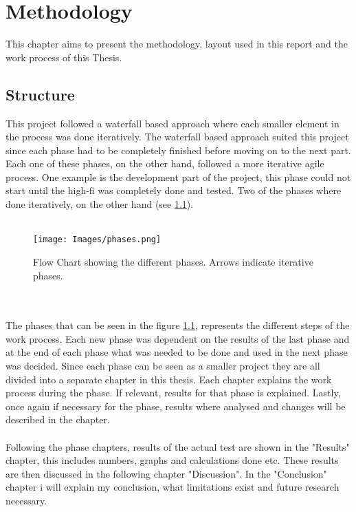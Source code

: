 
\chapter{Methodology} %

\label{Working_process} %

This chapter aims to present the methodology, layout used in this report and the work process of this Thesis.


\section{Structure}
This project followed a waterfall based approach where each smaller element in the process was done iteratively. The waterfall based approach suited this project since each phase had to be completely finished before moving on to the next part. Each one of these phases, on the other hand, followed a more iterative agile process. One example is the development part of the project, this phase could not start until the high-fi was completely done and tested. Two of the phases where done iteratively, on the other hand (see \ref{fig:phases}). 
\\\\
\begin{figure}[h]
	\centering
	\texttt{[image: Images/phases.png]}
	\decoRule
	\caption[Homepage]{Flow Chart showing the different phases. Arrows indicate iterative phases. }
	\label{fig:phases}
\end{figure}
\\\\
The phases that can be seen in the figure \ref{fig:phases}, represents the different steps of the work process. Each new phase was dependent on the results of the last phase and at the end of each phase what was needed to be done and used in the next phase was decided. Since each phase can be seen as a smaller project they are all divided into a separate chapter in this thesis. Each chapter explains the work process during the phase. If relevant, results for that phase is explained.  Lastly, once again if necessary for the phase, results where analysed and changes will be described in the chapter.
\\\\
Following the phase chapters, results of the actual test are shown in the "Results" chapter, this includes numbers, graphs and calculations done etc. These results are then discussed in the following chapter "Discussion". In the "Conclusion" chapter i will explain my conclusion, what limitations exist and future research necessary.